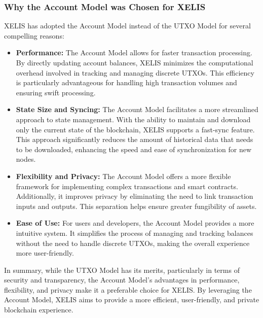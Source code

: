 \documentclass[10pt,a4paper,twocolumn]{article}
\begin{document}
\subsubsection{Why the Account Model was Chosen for XELIS}

XELIS has adopted the Account Model instead of the UTXO Model for several compelling reasons:
\begin{itemize}
\item \textbf{Performance:} The Account Model allows for faster transaction processing. By directly updating account balances, XELIS minimizes the computational overhead involved in tracking and managing discrete UTXOs. This efficiency is particularly advantageous for handling high transaction volumes and ensuring swift processing.\\

\item \textbf{State Size and Syncing:} The Account Model facilitates a more streamlined approach to state management. With the ability to maintain and download only the current state of the blockchain, XELIS supports a fast-sync feature. This approach significantly reduces the amount of historical data that needs to be downloaded, enhancing the speed and ease of synchronization for new nodes.\\

\item \textbf{Flexibility and Privacy:} The Account Model offers a more flexible framework for implementing complex transactions and smart contracts. Additionally, it improves privacy by eliminating the need to link transaction inputs and outputs. This separation helps ensure greater fungibility of assets.\\

\item \textbf{Ease of Use:} For users and developers, the Account Model provides a more intuitive system. It simplifies the process of managing and tracking balances without the need to handle discrete UTXOs, making the overall experience more user-friendly.\\
\end{itemize}
In summary, while the UTXO Model has its merits, particularly in terms of security and transparency, the Account Model's advantages in performance, flexibility, and privacy make it a preferable choice for XELIS. By leveraging the Account Model, XELIS aims to provide a more efficient, user-friendly, and private blockchain experience.\\
\end{document}
